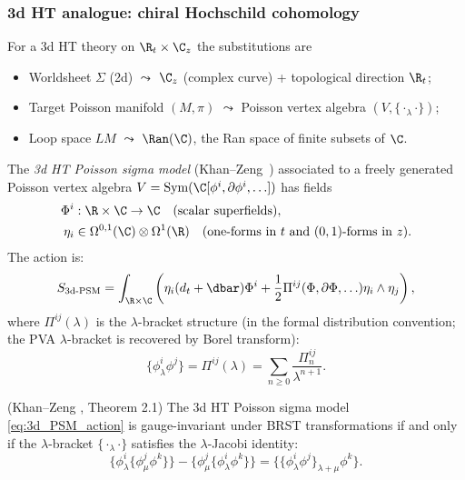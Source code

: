 \subsubsection{3d HT analogue: chiral Hochschild cohomology}
For a 3d HT theory on $\R_t \times \C_z$ the substitutions are
\begin{itemize}
\item Worldsheet $\Sigma$ (2d) $\leadsto$ $\C_z$ (complex curve) + topological direction $\R_t$;
\item Target Poisson manifold $(M, \pi)$ $\leadsto$ Poisson vertex algebra $(V, \{\cdot_\lambda \cdot\})$;
\item Loop space $LM$ $\leadsto$ $\Ran(\C)$, the Ran space of finite subsets of $\C$.
\end{itemize}
\begin{definition}
\label{def:3d_HT_PSM}
The \emph{3d HT Poisson sigma model} (Khan--Zeng~\cite{KZ25}) associated to a freely generated Poisson vertex algebra $V = \text{Sym}(\C[\phi^i, \partial \phi^i, \ldots])$ has fields
\begin{align}
\Phi^i &: \R \times \C \to \C \quad \text{(scalar superfields)}, \\
\eta_i &\in \Omega^{0,1}(\C) \otimes \Omega^1(\R) \quad \text{(one-forms in $t$ and $(0,1)$-forms in $z$)}.
\end{align}
The action is:
\begin{equation}
\label{eq:3d_PSM_action}
S_{\text{3d-PSM}} = \int_{\R \times \C} \left( \eta_i (d_t + \dbar) \Phi^i + \frac{1}{2} \Pi^{ij}(\Phi, \partial \Phi, \ldots) \eta_i \wedge \eta_j \right),
\end{equation}
where $\Pi^{ij}(\lambda)$ is the $\lambda$-bracket structure (in the formal distribution convention; the PVA $\lambda$-bracket is recovered by Borel transform):
\begin{equation}
\{\phi^i_\lambda \phi^j\} = \Pi^{ij}(\lambda) = \sum_{n \geq 0} \frac{\Pi^{ij}_n}{\lambda^{n+1}}.
\end{equation}
\end{definition}

\begin{theorem}
\label{thm:KZ_gauge_invariance}
(Khan--Zeng \cite{KZ25}, Theorem 2.1) The 3d HT Poisson sigma model \eqref{eq:3d_PSM_action} is gauge-invariant under BRST transformations if and only if the $\lambda$-bracket $\{\cdot_\lambda \cdot\}$ satisfies the $\lambda$-Jacobi identity:
\begin{equation}
\{\phi^i_\lambda \{\phi^j_\mu \phi^k\}\} - \{\phi^j_\mu \{\phi^i_\lambda \phi^k\}\} = \{\{\phi^i_\lambda \phi^j\}_{\lambda + \mu} \phi^k\}.
\end{equation}
\end{theorem}

